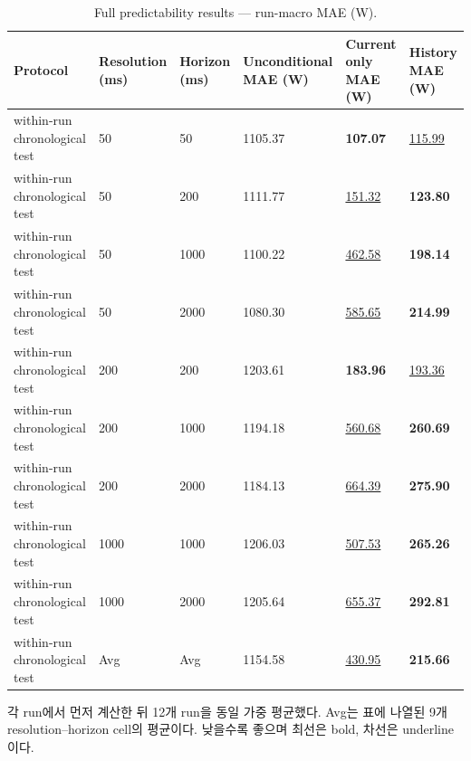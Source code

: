 \begin{table}[t]
\centering
\caption{Full predictability results — run-macro MAE (W).}
\label{tab:a2b_predictability_mae}
\small
\begin{tabular}{llllll}
\toprule
Protocol & Resolution (ms) & Horizon (ms) & Unconditional MAE (W) & Current only MAE (W) & History MAE (W) \\
\midrule
within-run chronological test & 50 & 50 & 1105.37 & \textbf{107.07} & \underline{115.99} \\
within-run chronological test & 50 & 200 & 1111.77 & \underline{151.32} & \textbf{123.80} \\
within-run chronological test & 50 & 1000 & 1100.22 & \underline{462.58} & \textbf{198.14} \\
within-run chronological test & 50 & 2000 & 1080.30 & \underline{585.65} & \textbf{214.99} \\
within-run chronological test & 200 & 200 & 1203.61 & \textbf{183.96} & \underline{193.36} \\
within-run chronological test & 200 & 1000 & 1194.18 & \underline{560.68} & \textbf{260.69} \\
within-run chronological test & 200 & 2000 & 1184.13 & \underline{664.39} & \textbf{275.90} \\
within-run chronological test & 1000 & 1000 & 1206.03 & \underline{507.53} & \textbf{265.26} \\
within-run chronological test & 1000 & 2000 & 1205.64 & \underline{655.37} & \textbf{292.81} \\
within-run chronological test & Avg & Avg & 1154.58 & \underline{430.95} & \textbf{215.66} \\
\bottomrule
\end{tabular}
\vspace{2pt}\par\footnotesize 각 run에서 먼저 계산한 뒤 12개 run을 동일 가중 평균했다. Avg는 표에 나열된 9개 resolution–horizon cell의 평균이다. 낮을수록 좋으며 최선은 bold, 차선은 underline이다.
\end{table}
